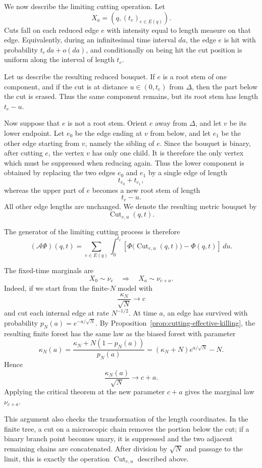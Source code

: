 \documentclass[11pt]{article}
\begin{document}
We now describe the limiting cutting operation. Let
\[
X_a=(q,(t_e)_{e\in E(q)}).
\]
Cuts fall on each reduced edge \(e\) with intensity equal to length measure on
that edge. Equivalently, during an infinitesimal time interval \(da\), the
edge \(e\) is hit with probability \(t_e\,da+o(da)\), and conditionally on
being hit the cut position is uniform along the interval of length \(t_e\).

Let us describe the resulting reduced bouquet. If \(e\) is a root stem of one
component, and if the cut is at distance \(u\in(0,t_e)\) from \(\Delta\), then
the part below the cut is erased. Thus the same
component remains, but its root stem has length \(t_e-u\).

Now suppose that \(e\) is not a root stem. Orient \(e\) away from \(\Delta\),
and let \(v\) be its lower endpoint. Let \(e_0\) be the edge ending at \(v\)
from below, and let \(e_1\) be the other edge starting from \(v\), namely the
sibling of \(e\). Since the bouquet is binary, after cutting \(e\), the vertex
\(v\) has only one child. It is therefore the only
vertex which must be suppressed when reducing again. Thus the lower component
is obtained by replacing the two edges \(e_0\) and \(e_1\) by a single edge of
length
\[
t_{e_0}+t_{e_1},
\]
whereas the upper part of \(e\) becomes a new root stem of length
\[
t_e-u.
\]
All other edge lengths are unchanged. We denote the resulting metric bouquet
by
\[
\operatorname{Cut}_{e,u}(q,t).
\]

The generator of the limiting cutting process is therefore
\[
(\mathcal A\Phi)(q,t)
=
\sum_{e\in E(q)}
\int_0^{t_e}
\left[
\Phi\bigl(\operatorname{Cut}_{e,u}(q,t)\bigr)
-
\Phi(q,t)
\right]\,du .
\]

The fixed-time marginals are
\[
X_0\sim\nu_c
\quad\Longrightarrow\quad
X_a\sim\nu_{c+a}.
\]
Indeed, if we start from the
finite-\(N\) model with
\[
\frac{\kappa_N}{\sqrt N}\longrightarrow c
\]
and cut each internal edge at rate \(N^{-1/2}\). At time \(a\), an edge has
survived with probability \(p_N(a)=e^{-a/\sqrt N}\). By
Proposition~\ref{prop:cutting-effective-killing}, the resulting finite
forest has the same law as the biased forest with parameter
\[
\kappa_N(a)
=
\frac{\kappa_N+N(1-p_N(a))}{p_N(a)}
=
(\kappa_N+N)e^{a/\sqrt N}-N.
\]
Hence
\[
\frac{\kappa_N(a)}{\sqrt N}\longrightarrow c+a.
\]
Applying the critical theorem at the new parameter \(c+a\) gives the marginal
law \(\nu_{c+a}\).

This argument also checks the transformation of the length coordinates. In the
finite tree, a cut on a microscopic chain removes the portion below the cut;
if a binary branch point becomes unary, it is suppressed and the two adjacent
remaining chains are concatenated. After division by \(\sqrt N\) and passage to the limit, this is
exactly the operation \(\operatorname{Cut}_{e,u}\) described above.
\end{document}
